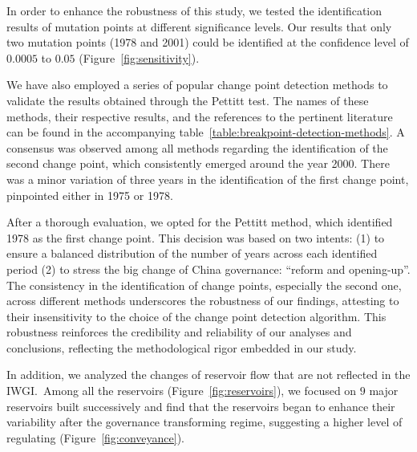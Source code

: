 In order to enhance the robustness of this study, we tested the identification results of mutation points at different significance levels.
Our results that only two mutation points (1978 and 2001) could be identified at the confidence level of $0.0005$ to $0.05$ (Figure~\ref{fig:sensitivity}).

We have also employed a series of popular change point detection methods to validate the results obtained through the Pettitt test. The names of these methods, their respective results, and the references to the pertinent literature can be found in the accompanying table~\ref{table:breakpoint-detection-methods}. A consensus was observed among all methods regarding the identification of the second change point, which consistently emerged around the year 2000. There was a minor variation of three years in the identification of the first change point, pinpointed either in 1975 or 1978.

After a thorough evaluation, we opted for the Pettitt method, which identified 1978 as the first change point. This decision was based on two intents: (1) to ensure a balanced distribution of the number of years across each identified period (2) to stress the big change of China governance: ``reform and opening-up''. The consistency in the identification of change points, especially the second one, across different methods underscores the robustness of our findings, attesting to their insensitivity to the choice of the change point detection algorithm. This robustness reinforces the credibility and reliability of our analyses and conclusions, reflecting the methodological rigor embedded in our study.



In addition, we analyzed the changes of reservoir flow that are not reflected in the IWGI.\ Among all the reservoirs (Figure~\ref{fig:reservoirs}), we focused on $9$ major reservoirs built successively and find that the reservoirs began to enhance their variability after the governance transforming regime, suggesting a higher level of regulating (Figure~\ref{fig:conveyance}).

